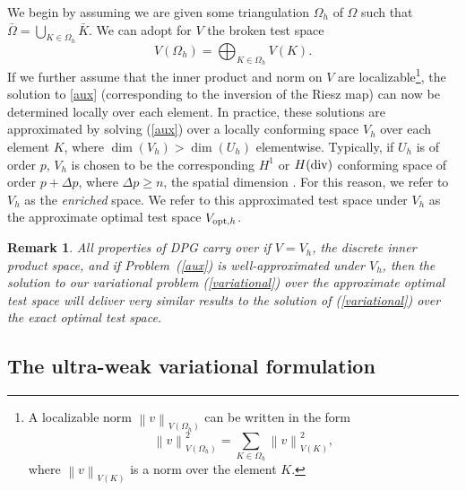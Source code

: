 \documentclass[11pt,onecolumn]{scrartcl}
\newcommand{\nor}[1]{\left\| #1 \right\|}
\newcommand{\Oh}{\Omega_h}
\newcommand{\del}{\Delta}
\newtheorem{remark}{Remark}
\begin{document}
We begin by assuming we are given some triangulation $\Omega_h$ of $\Omega$ such that $\bar{\Omega} = \bigcup_{K\in \Omega_h}\bar{K}$.  We can adopt for $V$ the broken test space
\[
V(\Oh) = \bigoplus_{K\in \Omega_h}V(K).
\]
If we further assume that the inner product and norm on $V$ are localizable\footnote{A localizable norm $\nor{v}_{V(\Oh)}$ can be written in the form 
$$\nor{v}_{V(\Oh)}^2 = \sum_{K\in\Oh} \nor{v}_{V(K)}^2,$$ where $\nor{v}_{V(K)}$ is a norm over the element $K$.}, the solution to \eqref{aux} (corresponding to the inversion of the Riesz map) can now be determined locally over each element.  In practice, these solutions are approximated by solving (\ref{aux}) over a locally conforming space $V_h$ over each element $K$, where $\dim(V_h) > \dim(U_h)$ elementwise.  Typically, if $U_h$ is of order $p$, $V_h$ is chosen to be the corresponding $H^1$ or $H({\rm div})$ conforming space of order $p + \del p$, where $\del p \geq n$, the spatial dimension \cite{practicalDPG}.  For this reason, we refer to $V_h$ as the \textit{enriched} space.  We refer to this approximated test space under $V_h$ as the approximate optimal test space $V_{{\rm opt},h}$.  
\begin{remark}
All properties of DPG carry over if $V=V_h$, the discrete inner product space, and if Problem~(\ref{aux}) is well-approximated under $V_h$, then the solution to our variational problem (\ref{variational}) over the approximate optimal test space will deliver very similar results to the solution of (\ref{variational}) over the exact optimal test space.  
\end{remark}

\subsection{The ultra-weak variational formulation}
\end{document}
